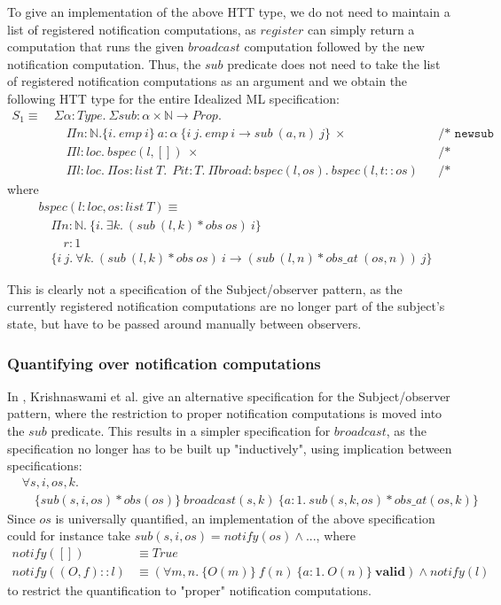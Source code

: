 \documentclass[a4paper,english]{article}
\newcommand{\N}[0]{\mathbb{N}}
\newcommand{\HPROP}[0]{Prop}
\newcommand{\TYPE}[0]{Type}
\newcommand{\LIST}[0]{list}
\newcommand{\LOC}[0]{loc}
\newcommand{\TRUE}[0]{True}
\newcommand{\VALID}[0]{\mathbf{valid}}
\newcommand{\pname}[1]{\texttt{/* #1 */}}
\begin{document}
To give an implementation of the above HTT type, we do not need to maintain a
list of registered notification computations, as $register$ can simply return a
computation that runs the given $broadcast$ computation followed by the new
notification computation. Thus, the $sub$ predicate does not need to take the
list of registered notification computations as an argument and we obtain the
following HTT type for the entire Idealized ML specification:
\begin{align*}
S_1 \equiv\ &\Sigma \alpha : \TYPE.\ \Sigma sub : \alpha \times \N \rightarrow \HPROP.\\
&\quad \Pi n : \N. \{ i.\ emp\ i\}\ a : \alpha\ \{i\ j.\ emp\ i \rightarrow sub\ (a, n)\ j \}\ \times && \pname{newsub}\\
&\quad \Pi l : \LOC.\ bspec(l, [])\ \times && \pname{broadcast}\\
&\quad \Pi l : \LOC.\ \Pi os : \LIST\ T.\ \ Pi t : T.\ \Pi broad : bspec(l, os).\ bspec(l, t::os) && \pname{register}
\end{align*}
where
\begin{align*}
& bspec(l : \LOC, os : \LIST\ T) \equiv\\
&\quad \Pi n : \N.\ \{ i.\ \exists k.\ (sub\ (l, k) * obs\ os)\ i \}\\
&\quad\quad r : 1\\
&\quad \{ i\ j.\ \forall k.\ (sub\ (l, k) * obs\ os)\ i \rightarrow (sub\ (l, n) * obs\_at\ (os, n))\ j \}
\end{align*}

This is clearly not a specification of the Subject/observer pattern, as the
currently registered notification computations are no longer part of the
subject's state, but have to be passed around manually between observers. 

\subsubsection{Quantifying over notification computations}

In \cite{patterns}, Krishnaswami et al. give an alternative specification for
the Subject/observer pattern, where the restriction to proper notification
computations is moved into the $sub$ predicate. This results in a simpler
specification for $broadcast$, as the specification no longer has to be built
up "inductively", using implication between specifications:
\begin{align*}
&\forall s, i, os, k.\\
&\quad\{ sub(s, i, os) * obs(os) \}\ broadcast(s, k)\ \{ a : 1.\ sub(s, k, os)
* obs\_at(os, k) \}
\end{align*}
Since $os$ is universally quantified, an implementation of the above specification could for instance take $sub(s, i, os) = notify(os) \land ...$, where
\begin{align*}
notify([]) &\equiv \TRUE\\
notify((O, f)::l) &\equiv (\forall m, n.\ \{ O(m) \}\ f(n)\ \{ a : 1.\ O(n) \}\ \VALID) \land notify(l)
\end{align*}
to restrict the quantification to "proper" notification computations. 
\end{document}
